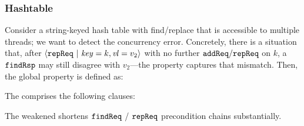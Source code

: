 \subsubsection*{Hashtable}
Consider a string-keyed hash table with find/replace that is accessible to multiple threads; we want to detect the concurrency error. Concretely, there is a situation that, after \({\langle} {\boldsymbol{{\tt repReq}}~|~{\mathit{key}=k,\mathit{vl}=v_2}} {\rangle}\) with no further \(\boldsymbol{{\tt addReq}}/\boldsymbol{{\tt repReq}}\) on \(k\), a \(\boldsymbol{{\tt findRsp}}\) may still disagree with \(v_2\)---the property captures that mismatch. Then, the global property is defined as:
\vspace{-.35cm}\par{}
\vspace{-.4cm}\par\nobreak\noindent
The \tyName{} comprises the following clauses:
\vspace{-.35cm}\par{}
\vspace{-.4cm}\par\nobreak\noindent
The weakened \tyName{} shortens \(\boldsymbol{{\tt findReq}}\) / \(\boldsymbol{{\tt repReq}}\) precondition chains substantially.

